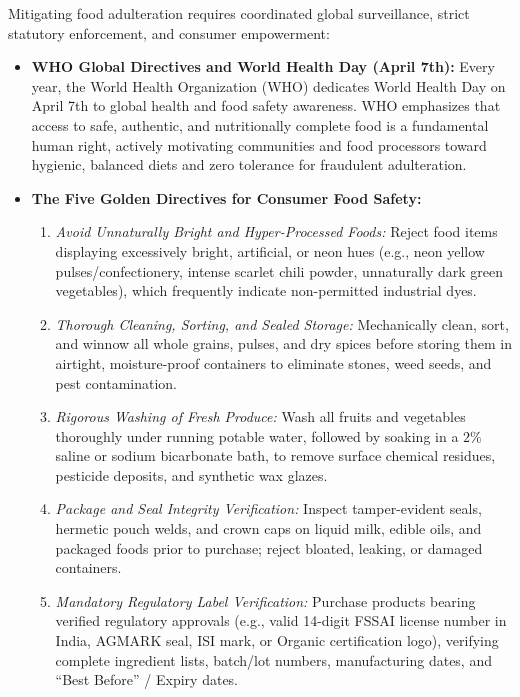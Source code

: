 \documentclass[11pt,a4paper,oneside]{article}
\begin{document}
Mitigating food adulteration requires coordinated global surveillance, strict statutory enforcement, and consumer empowerment:
\begin{itemize}[leftmargin=*]
    \item \textbf{WHO Global Directives and World Health Day (April 7th):} Every year, the World Health Organization (WHO) dedicates World Health Day on April 7th to global health and food safety awareness. WHO emphasizes that access to safe, authentic, and nutritionally complete food is a fundamental human right, actively motivating communities and food processors toward hygienic, balanced diets and zero tolerance for fraudulent adulteration.
    \item \textbf{The Five Golden Directives for Consumer Food Safety:}
    \begin{enumerate}[leftmargin=*]
        \item \textit{Avoid Unnaturally Bright and Hyper-Processed Foods:} Reject food items displaying excessively bright, artificial, or neon hues (e.g., neon yellow pulses/confectionery, intense scarlet chili powder, unnaturally dark green vegetables), which frequently indicate non-permitted industrial dyes.
        \item \textit{Thorough Cleaning, Sorting, and Sealed Storage:} Mechanically clean, sort, and winnow all whole grains, pulses, and dry spices before storing them in airtight, moisture-proof containers to eliminate stones, weed seeds, and pest contamination.
        \item \textit{Rigorous Washing of Fresh Produce:} Wash all fruits and vegetables thoroughly under running potable water, followed by soaking in a $2\%$ saline or sodium bicarbonate bath, to remove surface chemical residues, pesticide deposits, and synthetic wax glazes.
        \item \textit{Package and Seal Integrity Verification:} Inspect tamper-evident seals, hermetic pouch welds, and crown caps on liquid milk, edible oils, and packaged foods prior to purchase; reject bloated, leaking, or damaged containers.
        \item \textit{Mandatory Regulatory Label Verification:} Purchase products bearing verified regulatory approvals (e.g., valid 14-digit FSSAI license number in India, AGMARK seal, ISI mark, or Organic certification logo), verifying complete ingredient lists, batch/lot numbers, manufacturing dates, and ``Best Before'' / Expiry dates.
    \end{enumerate}
\end{itemize}
\end{document}
